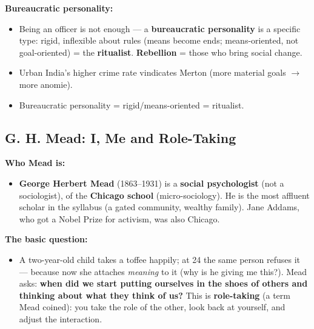 \begin{CriticalPoint}
\textbf{Bureaucratic personality:}
\begin{itemize}
\item Being an officer is not enough --- a \textbf{bureaucratic personality} is a specific type: rigid, inflexible about rules (means become ends; means-oriented, not goal-oriented) = the \textbf{ritualist}. \textbf{Rebellion} = those who bring social change.
\end{itemize}
\end{CriticalPoint}

\begin{QuickRevision}
\begin{itemize}
\item Urban India's higher crime rate vindicates Merton (more material goals $\rightarrow$ more anomie).
\item Bureaucratic personality = rigid/means-oriented = ritualist.
\end{itemize}
\end{QuickRevision}

\sectiondivider

\subsection{G. H. Mead: I, Me and Role-Taking}

\begin{DataFact}
\textbf{Who Mead is:}
\begin{itemize}
\item \textbf{George Herbert Mead} (1863--1931) is a \textbf{social psychologist} (not a sociologist), of the \textbf{Chicago school} (micro-sociology). He is the most affluent scholar in the syllabus (a gated community, wealthy family). Jane Addams, who got a Nobel Prize for activism, was also Chicago.
\end{itemize}
\end{DataFact}

\begin{KeyConcept}
\textbf{The basic question:}
\begin{itemize}
\item A two-year-old child takes a toffee happily; at 24 the same person refuses it --- because now she attaches \textit{meaning} to it (why is he giving me this?). Mead asks: \textbf{when did we start putting ourselves in the shoes of others and thinking about what they think of us?} This is \textbf{role-taking} (a term Mead coined): you take the role of the other, look back at yourself, and adjust the interaction.
\end{itemize}
\end{KeyConcept}

